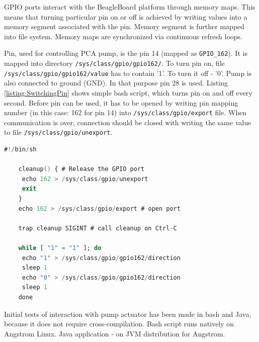 GPIO ports interact with the BeagleBoard platform through memory maps. This means that turning particular pin on or off is achieved by writing values into a memory segment associated with the pin. Memory segment is further mapped into file system. Memory maps are synchronized via continuous refresh loops.

Pin, used for controlling PCA pump, is the pin 14 (mapped as \lstinline{GPIO_162}). It is mapped into directory \lstinline{/sys/class/gpio/gpio162/}. To turn pin on, file \lstinline{/sys/class/gpio/gpio162/value} has to contain '1'. To turn it off - '0'. Pump is also connected to ground (GND). In that purpose pin 28 is used. Listing \ref{listing:SwitchingPin} shows simple bash script, which turns pin on and off every second. Before pin can be used, it has to be opened by writing pin mapping number (in this case: 162 for pin 14) into \lstinline{/sys/class/gpio/export} file. When communication is over, connection should be closed with writing the same value to file \lstinline{/sys/class/gpio/unexport}.

\begin{lstlisting}[language=ada, frame=single, gobble=0, caption={Turning pin on and off}]
	#!/bin/sh
	
	cleanup() { # Release the GPIO port
	 echo 162 > /sys/class/gpio/unexport
	 exit
	}
	echo 162 > /sys/class/gpio/export # open port

	trap cleanup SIGINT # call cleanup on Ctrl-C

	while [ "1" = "1" ]; do
	 echo "1" > /sys/class/gpio/gpio162/direction
	 sleep 1
	 echo "0" > /sys/class/gpio/gpio162/direction 
	 sleep 1
	done
\end{lstlisting} 
\label{listing:SwitchingPin}

Initial tests of interaction with pump actuator has been made in bash and Java, because it does not require cross-compilation. Bash script runs natively on Angstrom Linux. Java application - on JVM distribution for Angstrom. 


